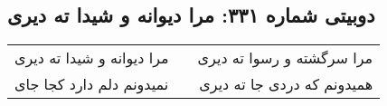 \begin{center}
\section*{دوبیتی شماره ۳۳۱: مرا دیوانه و شیدا ته دیری}
\label{sec:331}
\begin{longtable}{l p{0.5cm} r}
مرا دیوانه و شیدا ته دیری
&&
مرا سرگشته و رسوا ته دیری
\\
نمیدونم دلم دارد کجا جای
&&
همیدونم که دردی جا ته دیری
\\
\end{longtable}
\end{center}
